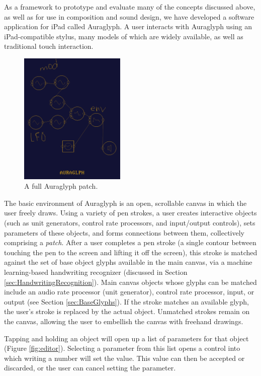 \documentclass{nime-alternate}
\begin{document}
As a framework to prototype and evaluate many of the concepts discussed above, as well as for   use in composition and sound design, we have developed a software application for iPad called Auraglyph. 
A user interacts with Auraglyph using an iPad-compatible stylus, many models of which are widely available, as well as traditional touch interaction. 

\begin{figure}[h]
	\centering
		\includegraphics[width=0.45\textwidth]{figures/patch.png}
	\caption{A full Auraglyph patch.}
	\label{fig:patch}
\end{figure}

The basic environment of Auraglyph is an open, scrollable canvas in which the user freely draws. 
Using a variety of pen strokes, a user creates interactive objects (such as unit generators, control rate processors, and input/output controls), sets parameters of these objects, and forms connections between them, collectively comprising a \emph{patch}. 
After a user completes a pen stroke (a single contour between touching the pen to the screen and lifting it off the screen), this stroke is matched against the set of base object glyphs available in the main canvas, via a machine learning-based handwriting recognizer (discussed in Section \ref{sec:HandwritingRecognition}). 
Main canvas objects whose glyphs can be matched include an audio rate processor (unit generator), control rate processor, input, or output (see Section \ref{sec:BaseGlyphs}). 
If the stroke matches an available glyph, the user's stroke is replaced by the actual object. 
Unmatched strokes remain on the canvas, allowing the user to embellish the canvas with freehand drawings. 

Tapping and holding an object will open up a list of parameters for that object (Figure \ref{fig:editor}). 
Selecting a parameter from this list opens a control into which writing a number will set the value. 
This value can then be accepted or discarded, or the user can cancel setting the parameter. 
\end{document}
